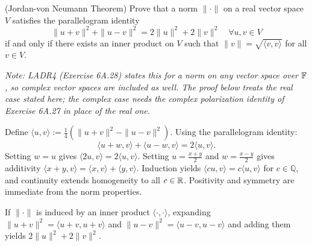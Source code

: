 \begin{xrcs}
  (Jordan-von Neumann Theorem) Prove that a norm $\|\cdot\|$ on a real vector space $V$ satisfies the parallelogram identity
  \begin{equation}
    \|u+v\|^2 + \|u-v\|^2 = 2\|u\|^2 + 2\|v\|^2 \quad \forall u,v \in V
  \end{equation}
  if and only if there exists an inner product on $V$ such that $\|v\| = \sqrt{\langle v, v \rangle}$ for all $v \in V$.

  \emph{Note: LADR4 (Exercise 6A.28) states this for a norm on any vector space over $\mathbb{F}$, so complex vector spaces are included as well. The proof below treats the real case stated here; the complex case needs the complex polarization identity of Exercise 6A.27 in place of the real one.}

\begin{xprf}
  \Rightarrowdirection Define $\langle u, v \rangle := \frac{1}{4}\left(\|u+v\|^2 - \|u-v\|^2\right)$.
  Using the parallelogram identity:
  \[
    \langle u+w, v \rangle + \langle u-w, v \rangle = 2\langle u, v \rangle.
  \]
  Setting $w = u$ gives $\langle 2u, v \rangle = 2\langle u, v \rangle$.
  Setting $u = \frac{x+y}{2}$ and $w = \frac{x-y}{2}$ gives additivity $\langle x+y, v \rangle = \langle x, v \rangle + \langle y, v \rangle$.
  Induction yields $\langle c u, v \rangle = c \langle u, v \rangle$ for $c \in \mathbb{Q}$, and continuity extends homogeneity to all $c \in \mathbb{R}$.
  Positivity and symmetry are immediate from the norm properties.

  \Leftarrowdirection If $\|\cdot\|$ is induced by an inner product $\langle \cdot, \cdot \rangle$, expanding $\|u+v\|^2 = \langle u+v, u+v \rangle$ and $\|u-v\|^2 = \langle u-v, u-v \rangle$ and adding them yields $2\|u\|^2 + 2\|v\|^2$.
\end{xprf}
\end{xrcs}

